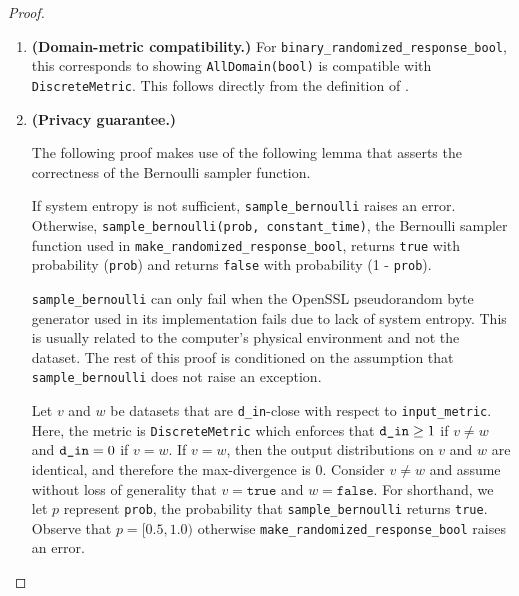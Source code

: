 \documentclass{article}
\begin{document}
\begin{proof} 
\hfill
\begin{enumerate}
    \item \textbf{(Domain-metric compatibility.)} For \texttt{binary\_randomized\_response\_bool}, this corresponds to showing \texttt{AllDomain(bool)} is compatible with \texttt{DiscreteMetric}. 
    This follows directly from the definition of .
    
    \item \textbf{(Privacy guarantee.)} 
    
    \begin{tcolorbox}
\begin{note}
The following proof makes use of the following lemma that asserts the correctness of the Bernoulli sampler function.
    \begin{lemma}
    If system entropy is not sufficient, \texttt{sample\_bernoulli} raises an error. 
    Otherwise, \texttt{sample\_bernoulli(prob, constant\_time)}, the Bernoulli sampler function used in \texttt{make\_randomized\_response\_bool}, 
    returns \texttt{true} with probability (\texttt{prob}) and returns  \texttt{false} with probability (1 - \texttt{prob}).
    \end{lemma}
\end{note}
\end{tcolorbox}

    \texttt{sample\_bernoulli} can only fail when the OpenSSL pseudorandom byte generator used in its implementation fails due to lack of system entropy. 
    This is usually related to the computer's physical environment and not the dataset. 
    The rest of this proof is conditioned on the assumption that \texttt{sample\_bernoulli} does not raise an exception. 
    
    Let $v$ and $w$ be datasets that are \texttt{d\_in}-close with respect to \texttt{input\_metric}.
    Here, the metric is \texttt{DiscreteMetric} which enforces that $\texttt{d\_in} \geq 1$ if $v \ne w$ and $\texttt{d\_in} = 0$ if $v = w$. 
    If $v = w$, then the output distributions on $v$ and $w$ are identical, and therefore the max-divergence is 0.
    Consider $v \ne w$ and assume without loss of generality that $v = \texttt{true}$ and $w = \texttt{false}$. 
    For shorthand, we let $p$ represent \texttt{prob}, the probability that \texttt{sample\_bernoulli} returns \texttt{true}. 
    Observe that $p = [0.5, 1.0)$ otherwise \texttt{make\_randomized\_response\_bool} raises an error. 
    

\end{enumerate}
\end{proof}
\end{document}
